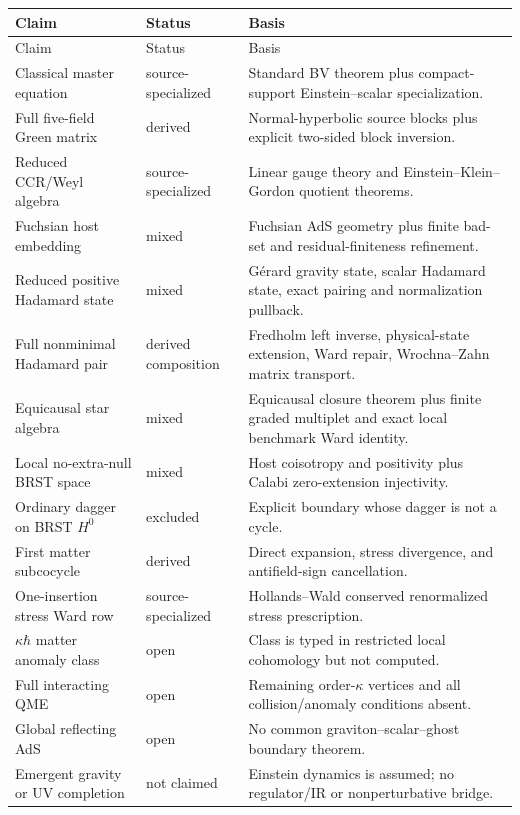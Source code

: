 \documentclass[11pt]{article}
\theoremstyle{definition}
\theoremstyle{remark}
\begin{document}
\begin{longtable}{p{}p{}p{}}
\toprule
Claim & Status & Basis\\
\midrule
\endfirsthead
\toprule
Claim & Status & Basis\\
\midrule
\endhead
Classical master equation & source-specialized & Standard BV theorem plus compact-support Einstein--scalar specialization.\\
Full five-field Green matrix & derived & Normal-hyperbolic source blocks plus explicit two-sided block inversion.\\
Reduced CCR/Weyl algebra & source-specialized & Linear gauge theory and Einstein--Klein--Gordon quotient theorems.\\
Fuchsian host embedding & mixed & Fuchsian AdS geometry plus finite bad-set and residual-finiteness refinement.\\
Reduced positive Hadamard state & mixed & G\'erard gravity state, scalar Hadamard state, exact pairing and normalization pullback.\\
Full nonminimal Hadamard pair & derived composition & Fredholm left inverse, physical-state extension, Ward repair, Wrochna--Zahn matrix transport.\\
Equicausal star algebra & mixed & Equicausal closure theorem plus finite graded multiplet and exact local benchmark Ward identity.\\
Local no-extra-null BRST space & mixed & Host coisotropy and positivity plus Calabi zero-extension injectivity.\\
Ordinary dagger on BRST $H^0$ & excluded & Explicit boundary whose dagger is not a cycle.\\
First matter subcocycle & derived & Direct expansion, stress divergence, and antifield-sign cancellation.\\
One-insertion stress Ward row & source-specialized & Hollands--Wald conserved renormalized stress prescription.\\
$\kappa\hbar$ matter anomaly class & open & Class is typed in restricted local cohomology but not computed.\\
Full interacting QME & open & Remaining order-$\kappa$ vertices and all collision/anomaly conditions absent.\\
Global reflecting AdS & open & No common graviton--scalar--ghost boundary theorem.\\
Emergent gravity or UV completion & not claimed & Einstein dynamics is assumed; no regulator/IR or nonperturbative bridge.\\
\bottomrule
\end{longtable}
\end{document}
